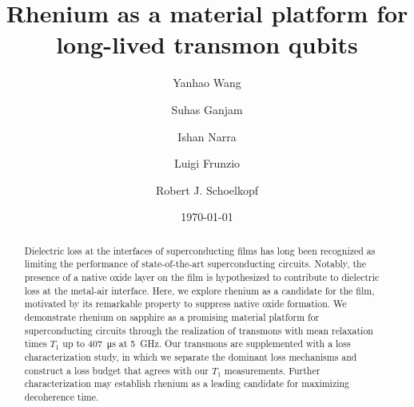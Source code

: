 \documentclass[
    reprint,
    superscriptaddress,
    amsmath,amssymb,
    aps,
    prb,
    floatfix,
]{revtex4-2}
\begin{document}
\title{Rhenium as a material platform for long-lived transmon qubits}

\author{Yanhao Wang}
    
\author{Suhas Ganjam}
    
\author{Ishan Narra}
    
\author{Luigi Frunzio}
    
\author{Robert J. Schoelkopf}

\date{\today}

\begin{abstract}
Dielectric loss at the interfaces of superconducting films has long been recognized as limiting the performance of state-of-the-art superconducting circuits. Notably, the presence of a native oxide layer on the film is hypothesized to contribute to dielectric loss at the metal-air interface. Here, we explore rhenium as a candidate for the film, motivated by its remarkable property to suppress native oxide formation. We demonstrate rhenium on sapphire as a promising material platform for superconducting circuits through the realization of transmons with mean relaxation times $T_1$ up to \SI{407}{\micro\second} at \SI{5}{\giga\hertz}. Our transmons are supplemented with a loss characterization study, in which we separate the dominant loss mechanisms and construct a loss budget that agrees with our $T_1$ measurements. Further characterization may establish rhenium as a leading candidate for maximizing decoherence time.
\end{abstract}
\end{document}
